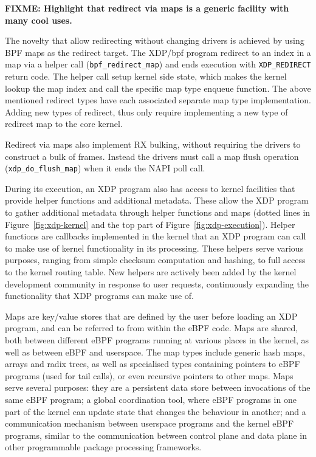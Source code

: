 \documentclass[10pt,sigconf]{acmart}
\begin{document}
\textbf{FIXME: Highlight that redirect via maps is
  a generic facility with many cool uses.}

The novelty that allow redirecting without changing drivers is achieved by using
BPF maps as the redirect target.  The XDP/bpf program redirect to an index in a
map via a helper call (\texttt{bpf\_redirect\_map}) and ends execution with
\texttt{XDP\_REDIRECT} return code. The helper call setup kernel side state,
which makes the kernel lookup the map index and call the specific map type
enqueue function.  The above mentioned redirect types have each associated
separate map type implementation.  Adding new types of redirect, thus only
require implementing a new type of redirect map to the core kernel.

Redirect via maps also implement RX bulking, without requiring the drivers to
construct a bulk of frames.  Instead the drivers must call a map flush operation
(\texttt{xdp\_do\_flush\_map}) when it ends the NAPI poll call.

During its execution, an XDP program also has access to kernel facilities that
provide helper functions and additional metadata. These allow the XDP program to
gather additional metadata through helper functions and maps (dotted lines in
Figure~\ref{fig:xdp-kernel} and the top part of Figure~\ref{fig:xdp-execution}).
%
%
%
%
Helper functions are callbacks implemented in the kernel that an XDP program can
call to make use of kernel functionality in its processing. These helpers
serve various purposes, ranging from simple checksum computation and hashing, to
full access to the kernel routing table. New helpers are actively been added by
the kernel development community in response to user requests, continuously
expanding the functionality that XDP programs can make use of.

Maps are key/value stores that are defined by the user before loading an XDP
program, and can be referred to from within the eBPF code. Maps are shared, both
between different eBPF programs running at various places in the kernel, as well
as between eBPF and userspace. The map types include generic hash maps, arrays
and radix trees, as well as specialised types containing pointers to eBPF
programs (used for tail calls), or even recursive pointers to other maps. Maps
serve several purposes: they are a persistent data store between invocations of
the same eBPF program; a global coordination tool, where eBPF programs in one
part of the kernel can update state that changes the behaviour in another; and a
communication mechanism between userspace programs and the kernel eBPF programs,
similar to the communication between control plane and data plane in other
programmable package processing frameworks.
\end{document}

